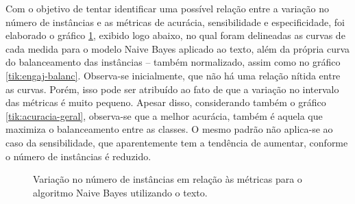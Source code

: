 \documentclass[oneside,openright,12pt]{ufsm_2015} %
\begin{document}
    \par Com o objetivo de tentar identificar uma possível relação entre a variação no número de instâncias e as métricas de acurácia, sensibilidade e especificidade, foi elaborado o gráfico \ref{tik:balanc-metricas}, exibido logo abaixo, no qual foram delineadas as curvas de cada medida para o modelo Naive Bayes aplicado ao texto, além da própria curva do balanceamento das instâncias -- também normalizado, assim como no gráfico \ref{tik:engaj-balanc}. Observa-se inicialmente, que não há uma relação nítida entre as curvas. Porém, isso pode ser atribuído ao fato de que a variação no intervalo das métricas é muito pequeno. Apesar disso, considerando também o gráfico \ref{tik:acuracia-geral}, observa-se que a melhor acurácia, também é aquela que maximiza o balanceamento entre as classes. O mesmo padrão não aplica-se ao caso da sensibilidade, que aparentemente tem a tendência de aumentar, conforme o número de instâncias é reduzido.

    \begin{figure}[!ht]
    \caption{Variação no número de instâncias em relação às métricas para o algoritmo Naive Bayes utilizando o texto.}
    \centering
    \label{tik:balanc-metricas}
    \end{figure}
\end{document}
